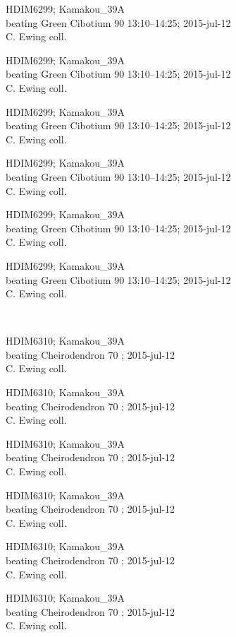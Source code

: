 \documentclass[2pt]{extarticle}
\begin{document}
\noindent
\parbox{0.16\textwidth}{\tiny \raggedright \rule[-0.3\baselineskip]{0pt}{10pt}HDIM6299; Kamakou\_39A\\ beating Green Cibotium 90 13:10--14:25; 2015-jul-12\\ C. Ewing coll.}
\parbox{0.16\textwidth}{\tiny \raggedright \rule[-0.3\baselineskip]{0pt}{10pt}HDIM6299; Kamakou\_39A\\ beating Green Cibotium 90 13:10--14:25; 2015-jul-12\\ C. Ewing coll.}
\parbox{0.16\textwidth}{\tiny \raggedright \rule[-0.3\baselineskip]{0pt}{10pt}HDIM6299; Kamakou\_39A\\ beating Green Cibotium 90 13:10--14:25; 2015-jul-12\\ C. Ewing coll.}
\parbox{0.16\textwidth}{\tiny \raggedright \rule[-0.3\baselineskip]{0pt}{10pt}HDIM6299; Kamakou\_39A\\ beating Green Cibotium 90 13:10--14:25; 2015-jul-12\\ C. Ewing coll.}
\parbox{0.16\textwidth}{\tiny \raggedright \rule[-0.3\baselineskip]{0pt}{10pt}HDIM6299; Kamakou\_39A\\ beating Green Cibotium 90 13:10--14:25; 2015-jul-12\\ C. Ewing coll.}
\parbox{0.16\textwidth}{\tiny \raggedright \rule[-0.3\baselineskip]{0pt}{10pt}HDIM6299; Kamakou\_39A\\ beating Green Cibotium 90 13:10--14:25; 2015-jul-12\\ C. Ewing coll.} \\ 
\vspace{0.001in} 

\noindent
\parbox{0.16\textwidth}{\tiny \raggedright \rule[-0.3\baselineskip]{0pt}{10pt}HDIM6310; Kamakou\_39A\\ beating Cheirodendron 70 ; 2015-jul-12\\ C. Ewing coll.}
\parbox{0.16\textwidth}{\tiny \raggedright \rule[-0.3\baselineskip]{0pt}{10pt}HDIM6310; Kamakou\_39A\\ beating Cheirodendron 70 ; 2015-jul-12\\ C. Ewing coll.}
\parbox{0.16\textwidth}{\tiny \raggedright \rule[-0.3\baselineskip]{0pt}{10pt}HDIM6310; Kamakou\_39A\\ beating Cheirodendron 70 ; 2015-jul-12\\ C. Ewing coll.}
\parbox{0.16\textwidth}{\tiny \raggedright \rule[-0.3\baselineskip]{0pt}{10pt}HDIM6310; Kamakou\_39A\\ beating Cheirodendron 70 ; 2015-jul-12\\ C. Ewing coll.}
\parbox{0.16\textwidth}{\tiny \raggedright \rule[-0.3\baselineskip]{0pt}{10pt}HDIM6310; Kamakou\_39A\\ beating Cheirodendron 70 ; 2015-jul-12\\ C. Ewing coll.}
\parbox{0.16\textwidth}{\tiny \raggedright \rule[-0.3\baselineskip]{0pt}{10pt}HDIM6310; Kamakou\_39A\\ beating Cheirodendron 70 ; 2015-jul-12\\ C. Ewing coll.} \\ 
\vspace{0.001in} 
\end{document}
